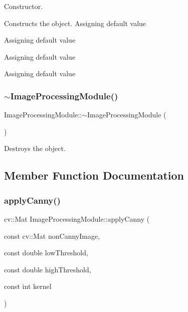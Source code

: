Constructor. 

Constructs the object. Assigning default value

Assigning default value

Assigning default value

Assigning default value \mbox{\label{class_image_processing_module_a5f5c41eb1df297c230c777a2cac6e56a}} 
\subsubsection{\texorpdfstring{$\sim$\+Image\+Processing\+Module()}{~ImageProcessingModule()}}
{\footnotesize\ttfamily Image\+Processing\+Module\+::$\sim$\+Image\+Processing\+Module (\begin{DoxyParamCaption}{ }\end{DoxyParamCaption})}



Destroys the object. 



\subsection{Member Function Documentation}
\mbox{\label{class_image_processing_module_a19f01000f1607018deb4ff09b2fbc652}} 
\subsubsection{\texorpdfstring{apply\+Canny()}{applyCanny()}}
{\footnotesize\ttfamily cv\+::\+Mat Image\+Processing\+Module\+::apply\+Canny (\begin{DoxyParamCaption}\item[{const cv\+::\+Mat}]{non\+Canny\+Image,  }\item[{const double}]{low\+Threshold,  }\item[{const double}]{high\+Threshold,  }\item[{const int}]{kernel }\end{DoxyParamCaption})}




